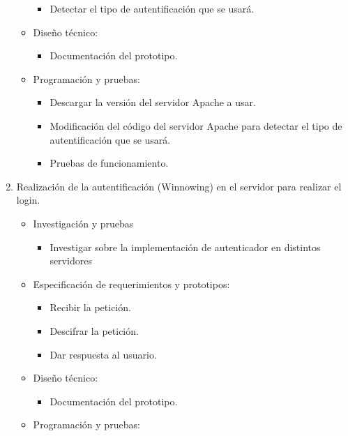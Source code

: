 \documentclass[12pt, a4paper, titlepage]{article}
\begin{document}
\begin{enumerate}
\begin{itemize}
\begin{itemize}
                    \item  Detectar el tipo de autentificación que se usará.
                \end{itemize}
                \item Diseño técnico: 
                \begin{itemize}
                    \item Documentación del prototipo.
                \end{itemize}
                \item Programación y pruebas:
                \begin{itemize}
                    \item Descargar la versión del servidor Apache a usar.
                    \item Modificación del código del servidor Apache para detectar el tipo de autentificación que se usará. 
                    \item Pruebas de funcionamiento.
                \end{itemize}
            \end{itemize}
            \item Realización de la autentificación (Winnowing) en el servidor para realizar el login.
            \begin{itemize}
                \item Investigación y pruebas
                \begin{itemize}
                    \item  Investigar sobre la implementación de autenticador en distintos servidores 
                \end{itemize}
                \item Especificación de requerimientos y prototipos:
                \begin{itemize}
                    \item Recibir la petición.
                    \item Descifrar la petición.
                    \item Dar respuesta al usuario.
                \end{itemize}
                \item Diseño técnico:
                \begin{itemize}
                    \item Documentación del prototipo. 
                \end{itemize}
                \item Programación y pruebas:

\end{itemize}
\end{enumerate}
\end{document}
